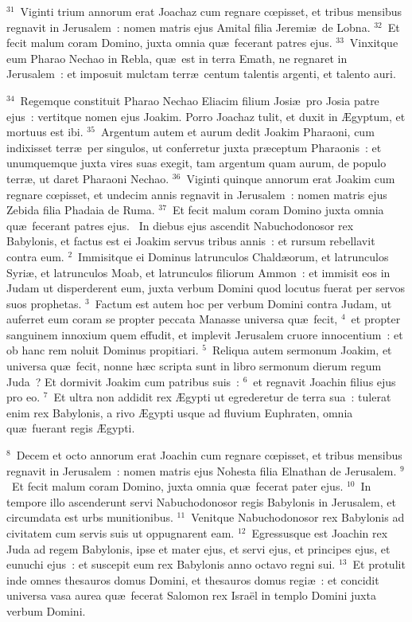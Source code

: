 ${}^{31}$~Viginti trium annorum erat Joachaz cum regnare cœpisset, et tribus mensibus regnavit in Jerusalem~: nomen matris ejus Amital filia Jeremi\ae\ de Lobna.
${}^{32}$~Et fecit malum coram Domino, juxta omnia qu\ae\ fecerant patres ejus.
${}^{33}$~Vinxitque eum Pharao Nechao in Rebla, qu\ae\ est in terra Emath, ne regnaret in Jerusalem~: et imposuit mulctam terr\ae\ centum talentis argenti, et talento auri.


${}^{34}$~Regemque constituit Pharao Nechao Eliacim filium Josi\ae\ pro Josia patre ejus~: vertitque nomen ejus Joakim. Porro Joachaz tulit, et duxit in \AE gyptum, et mortuus est ibi.
${}^{35}$~Argentum autem et aurum dedit Joakim Pharaoni, cum indixisset terr\ae\ per singulos, ut conferretur juxta pr\ae ceptum Pharaonis~: et unumquemque juxta vires suas exegit, tam argentum quam aurum, de populo terr\ae , ut daret Pharaoni Nechao.
${}^{36}$~Viginti quinque annorum erat Joakim cum regnare cœpisset, et undecim annis regnavit in Jerusalem~: nomen matris ejus Zebida filia Phadaia de Ruma.
${}^{37}$~Et fecit malum coram Domino juxta omnia qu\ae\ fecerant patres ejus.
~In diebus ejus ascendit Nabuchodonosor rex Babylonis, et factus est ei Joakim servus tribus annis~: et rursum rebellavit contra eum.
${}^{2}$~Immisitque ei Dominus latrunculos Chald\ae orum, et latrunculos Syri\ae , et latrunculos Moab, et latrunculos filiorum Ammon~: et immisit eos in Judam ut disperderent eum, juxta verbum Domini quod locutus fuerat per servos suos prophetas.
${}^{3}$~Factum est autem hoc per verbum Domini contra Judam, ut auferret eum coram se propter peccata Manasse universa qu\ae\ fecit,
${}^{4}$~et propter sanguinem innoxium quem effudit, et implevit Jerusalem cruore innocentium~: et ob hanc rem noluit Dominus propitiari.
${}^{5}$~Reliqua autem sermonum Joakim, et universa qu\ae\ fecit, nonne h\ae c scripta sunt in libro sermonum dierum regum Juda~? Et dormivit Joakim cum patribus suis~:
${}^{6}$~et regnavit Joachin filius ejus pro eo.
${}^{7}$~Et ultra non addidit rex \AE gypti ut egrederetur de terra sua~: tulerat enim rex Babylonis, a rivo \AE gypti usque ad fluvium Euphraten, omnia qu\ae\ fuerant regis \AE gypti.


${}^{8}$~Decem et octo annorum erat Joachin cum regnare cœpisset, et tribus mensibus regnavit in Jerusalem~: nomen matris ejus Nohesta filia Elnathan de Jerusalem.
${}^{9}$~Et fecit malum coram Domino, juxta omnia qu\ae\ fecerat pater ejus.
${}^{10}$~In tempore illo ascenderunt servi Nabuchodonosor regis Babylonis in Jerusalem, et circumdata est urbs munitionibus.
${}^{11}$~Venitque Nabuchodonosor rex Babylonis ad civitatem cum servis suis ut oppugnarent eam.
${}^{12}$~Egressusque est Joachin rex Juda ad regem Babylonis, ipse et mater ejus, et servi ejus, et principes ejus, et eunuchi ejus~: et suscepit eum rex Babylonis anno octavo regni sui.
${}^{13}$~Et protulit inde omnes thesauros domus Domini, et thesauros domus regi\ae~: et concidit universa vasa aurea qu\ae\ fecerat Salomon rex Isra\"el in templo Domini juxta verbum Domini.


